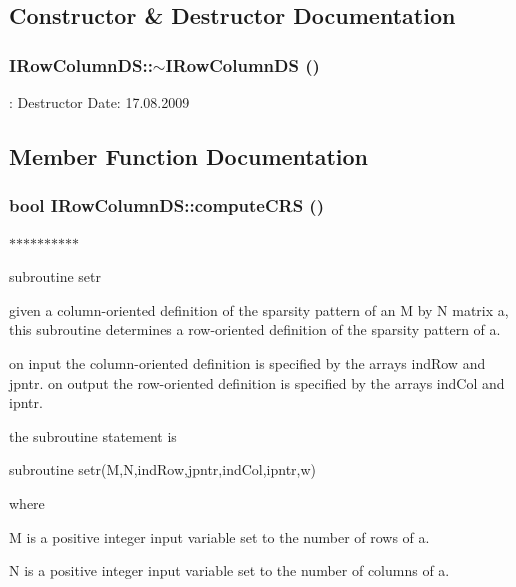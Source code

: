 \subsection{Constructor \& Destructor Documentation}
\hypertarget{classIRowColumnDS_a70790b6b45416fde307ac8c7b456e005}{
\subsubsection[{$\sim$IRowColumnDS}]{\setlength{\rightskip}{0pt plus 5cm}IRowColumnDS::$\sim$IRowColumnDS ()}}
\label{classIRowColumnDS_a70790b6b45416fde307ac8c7b456e005}
: Destructor  Date: 17.08.2009 

\subsection{Member Function Documentation}
\hypertarget{classIRowColumnDS_ab93c5ed2748d15f61ac047a033e0deca}{
\subsubsection[{computeCRS}]{\setlength{\rightskip}{0pt plus 5cm}bool IRowColumnDS::computeCRS ()}}
\label{classIRowColumnDS_ab93c5ed2748d15f61ac047a033e0deca}


$\ast$$\ast$$\ast$$\ast$$\ast$$\ast$$\ast$$\ast$$\ast$$\ast$

subroutine setr

given a column-\/oriented definition of the sparsity pattern of an M by N matrix a, this subroutine determines a row-\/oriented definition of the sparsity pattern of a.

on input the column-\/oriented definition is specified by the arrays indRow and jpntr. on output the row-\/oriented definition is specified by the arrays indCol and ipntr.

the subroutine statement is

subroutine setr(M,N,indRow,jpntr,indCol,ipntr,w)

where

M is a positive integer input variable set to the number of rows of a.

N is a positive integer input variable set to the number of columns of a.


